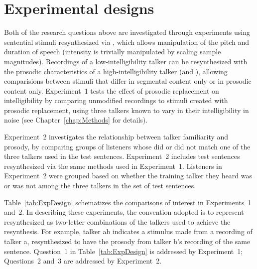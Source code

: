\section{Experimental designs\label{sec:ExpDesign}}
Both of the research questions above are investigated through experiments using sentential stimuli resynthesized via \psola{} \citep{MoulinesCharpentier1990}, which allows manipulation of the pitch and duration of speech (intensity is trivially manipulated by scaling sample magnitudes).  Recordings of a low-intelligibility talker can be resynthesized with the prosodic characteristics of a high-intelligibility talker (and \vv), allowing comparisions between stimuli that differ in segmental content only or in prosodic content only.  Experiment~1 tests the effect of prosodic replacement on intelligibility by comparing unmodified recordings to stimuli created with prosodic replacement, using three talkers known to vary in their intelligibility in noise (see Chapter~\ref{chap:Methods} for details).

Experiment~2 investigates the relationship between talker familiarity and prosody, by comparing groups of listeners whose  did or did not match one of the three talkers used in the test sentences.  Experiment~2 includes test sentences resynthesized via the same methods used in Experiment~1.  Listeners in Experiment~2 were grouped based on whether the training talker they heard was or was not among the three talkers in the set of test sentences.

Table~\ref{tab:ExpDesign} schematizes the comparisons of interest in Experiments~1 and~2.  In describing these experiments, the convention adopted is to represent resynthesized  as two-letter combinations of the talkers used to achieve the resynthesis.  For example, talker \ac{ab} indicates a stimulus made from a recording of talker \ac{a}, resynthesized to have the prosody from talker \ac{b}’s recording of the same sentence.  Question~1 in Table~\ref{tab:ExpDesign} is addressed by Experiment~1; Questions~2 and~3 are addressed by Experiment~2.

